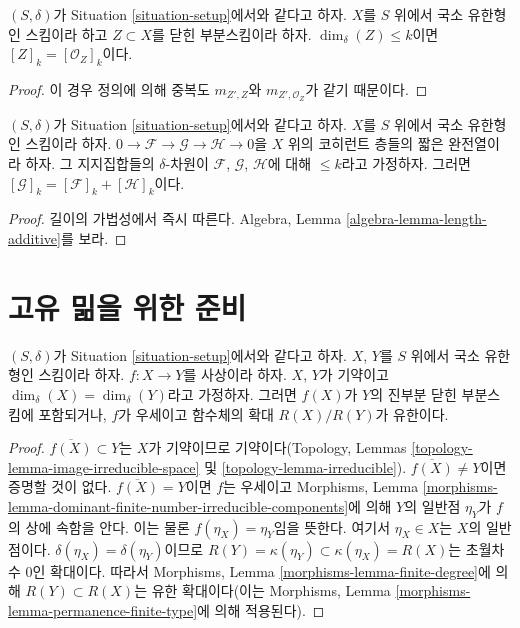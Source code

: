 \begin{lemma}
\label{lemma-cycle-closed-coherent}
$(S, \delta)$가 Situation \ref{situation-setup}에서와 같다고 하자.
$X$를 $S$ 위에서 국소 유한형인 스킴이라 하고 $Z \subset X$를 닫힌
부분스킴이라 하자. $\dim_\delta(Z) \leq k$이면
$[Z]_k = [{\mathcal O}_Z]_k$이다.
\end{lemma}

\begin{proof}
이 경우 정의에 의해 중복도 $m_{Z', Z}$와
$m_{Z', \mathcal{O}_Z}$가 같기 때문이다.
\end{proof}

\begin{lemma}
\label{lemma-additivity-sheaf-cycle}
$(S, \delta)$가 Situation \ref{situation-setup}에서와 같다고 하자.
$X$를 $S$ 위에서 국소 유한형인 스킴이라 하자.
$0 \to \mathcal{F} \to \mathcal{G} \to \mathcal{H} \to 0$을 $X$ 위의
코히런트 층들의 짧은 완전열이라 하자. 그 지지집합들의
$\delta$-차원이 $\mathcal{F}$, $\mathcal{G}$, $\mathcal{H}$에 대해
$\leq k$라고 가정하자.
그러면 $[\mathcal{G}]_k = [\mathcal{F}]_k + [\mathcal{H}]_k$이다.
\end{lemma}

\begin{proof}
길이의 가법성에서 즉시 따른다. Algebra, Lemma
\ref{algebra-lemma-length-additive}를 보라.
\end{proof}

\section{고유 밂을 위한 준비}
\label{section-preparation-pushforward}

\begin{lemma}
\label{lemma-equal-dimension}
$(S, \delta)$가 Situation \ref{situation-setup}에서와 같다고 하자.
$X$, $Y$를 $S$ 위에서 국소 유한형인 스킴이라 하자.
$f : X \to Y$를 사상이라 하자.
$X$, $Y$가 기약이고 $\dim_\delta(X) = \dim_\delta(Y)$라고 가정하자.
그러면 $f(X)$가 $Y$의 진부분 닫힌 부분스킴에 포함되거나, $f$가
우세이고 함수체의 확대 $R(X)/R(Y)$가 유한이다.
\end{lemma}

\begin{proof}
$\overline{f(X)} \subset Y$는 $X$가 기약이므로 기약이다(Topology, Lemmas
\ref{topology-lemma-image-irreducible-space} 및
\ref{topology-lemma-irreducible}).
$\overline{f(X)} \not = Y$이면 증명할 것이 없다.
$\overline{f(X)} = Y$이면 $f$는 우세이고 Morphisms,
Lemma \ref{morphisms-lemma-dominant-finite-number-irreducible-components}에
의해 $Y$의 일반점 $\eta_Y$가 $f$의 상에 속함을 안다.
이는 물론 $f(\eta_X) = \eta_Y$임을 뜻한다. 여기서 $\eta_X \in X$는
$X$의 일반점이다. $\delta(\eta_X) = \delta(\eta_Y)$이므로
$R(Y) = \kappa(\eta_Y) \subset \kappa(\eta_X) = R(X)$는 초월차수
$0$인 확대이다.
따라서 Morphisms, Lemma \ref{morphisms-lemma-finite-degree}에 의해
$R(Y) \subset R(X)$는 유한 확대이다(이는 Morphisms, Lemma
\ref{morphisms-lemma-permanence-finite-type}에 의해 적용된다).
\end{proof}

